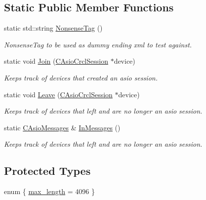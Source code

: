 \subsection*{Static Public Member Functions}
\begin{DoxyCompactItemize}
\item 
static std\-::string \hyperlink{classCAsioCrclSession_adb72599a90e3bbca7502dc31062a2519}{Nonsense\-Tag} ()
\begin{DoxyCompactList}\small\item\em Nonsense\-Tag to be used as dummy ending xml to test against. \end{DoxyCompactList}\item 
static void \hyperlink{classCAsioCrclSession_a4a7b688b3c5a3bc348ccad3bc5c85354}{Join} (\hyperlink{classCAsioCrclSession}{C\-Asio\-Crcl\-Session} $\ast$device)
\begin{DoxyCompactList}\small\item\em Keeps track of devices that created an asio session. \end{DoxyCompactList}\item 
static void \hyperlink{classCAsioCrclSession_a5dca80201984fda94f4f3ef07ac5d2d5}{Leave} (\hyperlink{classCAsioCrclSession}{C\-Asio\-Crcl\-Session} $\ast$device)
\begin{DoxyCompactList}\small\item\em Keeps track of devices that left and are no longer an asio session. \end{DoxyCompactList}\item 
static \hyperlink{AsioCrclServer_8h_a1437e07e96384f32c0bd411135742579}{C\-Asio\-Messages} \& \hyperlink{classCAsioCrclSession_a91a044873d66e330a16e822aea21d84e}{In\-Messages} ()
\begin{DoxyCompactList}\small\item\em Keeps track of devices that left and are no longer an asio session. \end{DoxyCompactList}\end{DoxyCompactItemize}
\subsection*{Protected Types}
\begin{DoxyCompactItemize}
\item 
enum \{ \hyperlink{classCAsioCrclSession_a459056f275a7910eeaf4f1ce2a4d48e3a5e7b7a77c3bed2e03563151933b78440}{max\-\_\-length} = 4096
 \}
\end{DoxyCompactItemize}

